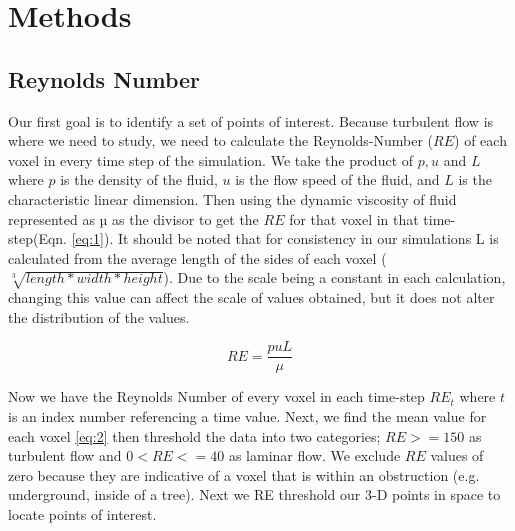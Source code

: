 
\chapter{Methods} %

\label{Chapter2} %


\section{Reynolds Number}

Our first goal is to identify a set of points of interest. Because turbulent flow is where we need to study, we need to calculate the Reynolds-Number (\ensuremath{RE}) of each voxel in every time step of the simulation. We take the product of \ensuremath{p, u} and \ensuremath{L} where \ensuremath{p} is the density of the fluid, \ensuremath{u} is the flow speed of the fluid, and \ensuremath{L} is the characteristic linear dimension. Then using the dynamic viscosity of fluid represented as µ as the divisor to get the \ensuremath{RE} for that voxel in that time-step(Eqn. \ref{eq:1}). It should be noted that for consistency in our simulations L is calculated from the average length of the sides of each voxel (\ensuremath{\sqrt[3]{length * width * height}}). Due to the scale being a constant in each calculation, changing this value can affect the scale of values obtained, but it does not alter the distribution of the values. 


\begin{equation}\label{eq:1}
RE  = \frac{puL} {\mu} 
\end{equation}


Now we have the Reynolds Number of every voxel in each time-step \ensuremath{RE_t} where \ensuremath{t} is an index number referencing a time value. Next, we find the mean value for each voxel \ref{eq:2} then threshold the data into two categories; \ensuremath{RE >= 150} as turbulent flow and \ensuremath{0 < RE <= 40} as laminar flow. We exclude \ensuremath{RE} values of zero because they are indicative of a voxel that is within an obstruction (e.g. underground, inside of a tree). Next we RE threshold our 3-D points in space to locate points of interest.


